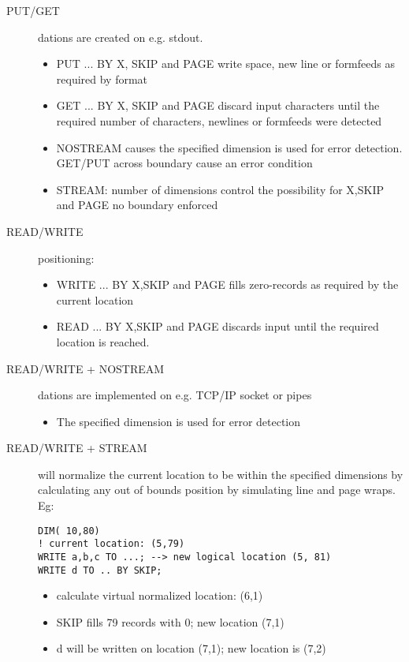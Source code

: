 \begin{description}
\item[PUT/GET] dations are created on e.g. stdout. 
   \begin{itemize}
   \item PUT ... BY X, SKIP and PAGE write space, new line or formfeeds
         as required by format
   \item  GET ... BY X, SKIP and PAGE discard input characters until the
         required number of characters, newlines or formfeeds were detected
   \item NOSTREAM causes 
        the specified dimension is used for error detection. 
         GET/PUT across boundary cause an error condition
   \item STREAM:
         number of dimensions control the possibility for X,SKIP and PAGE
         no boundary enforced
   \end{itemize}

\item[READ/WRITE] positioning:
   \begin{itemize}
     \item WRITE ... BY  X,SKIP and PAGE fills zero-records as required 
           by the current location
     \item READ ... BY  X,SKIP and PAGE discards input until 
           the required location is reached.
   \end{itemize}
\item[READ/WRITE + NOSTREAM] dations are implemented on e.g.
        TCP/IP socket or pipes
   \begin{itemize}
    \item The specified dimension is used for error detection
    \end{itemize}
\item[ READ/WRITE + STREAM] will  
        normalize the current location to be within the specified dimensions
        by calculating any out of bounds position by simulating line
        and page wraps. Eg:
\begin{verbatim}
DIM( 10,80)
! current location: (5,79)
WRITE a,b,c TO ...; --> new logical location (5, 81)
WRITE d TO .. BY SKIP;
\end{verbatim}
    \begin{itemize}
     \item calculate virtual normalized location: (6,1)
     \item SKIP fills 79 records with 0; new location (7,1)
     \item d will be written on location (7,1); new location is  (7,2)
     \end{itemize}
\end{description}


